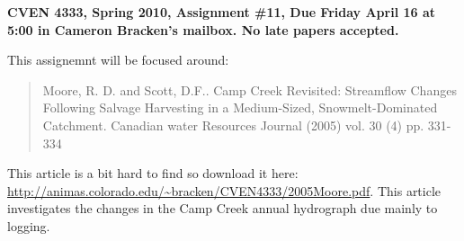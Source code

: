\documentclass[11pt]{article}
\begin{document}
\textbf{CVEN 4333, Spring 2010, Assignment \#11, Due Friday April 16 at 5:00 in Cameron Bracken's mailbox. No late papers accepted.}

This assignemnt will be focused around:

\begin{quote}Moore, R. D. and Scott, D.F.. Camp Creek Revisited: Streamflow Changes Following Salvage Harvesting in a Medium-Sized, Snowmelt-Dominated Catchment. Canadian water Resources Journal (2005) vol. 30 (4) pp. 331-334\end{quote}

This article is a bit hard to find so download it here: \url{http://animas.colorado.edu/~bracken/CVEN4333/2005Moore.pdf}.  This article investigates the changes in the Camp Creek annual hydrograph due mainly to logging. 
\end{document}
